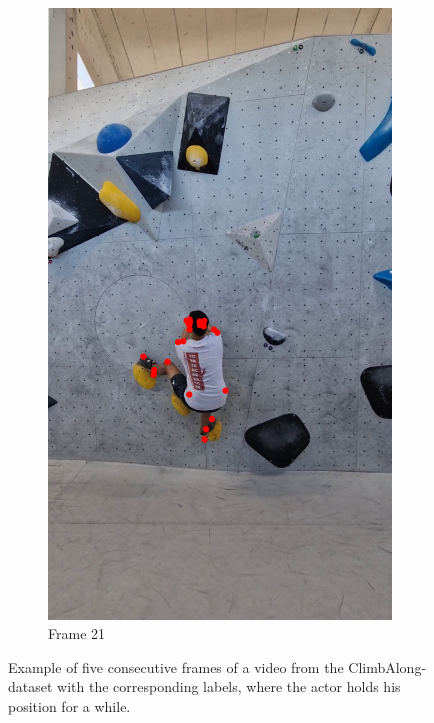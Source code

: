 \documentclass[./main.tex]{subfiles}
\begin{document}
\begin{figure}[htbp]
\begin{subfigure}{0.3\textwidth}
        \includegraphics[width=\textwidth]{entities/CA_21.png}
        \caption{Frame 21}
    \end{subfigure}
    \caption{Example of five consecutive frames of a video from the ClimbAlong-dataset with the corresponding labels, where the actor holds his position for a while.}
    \label{fig:CA_dataset_static}
\end{figure}
\end{document}
